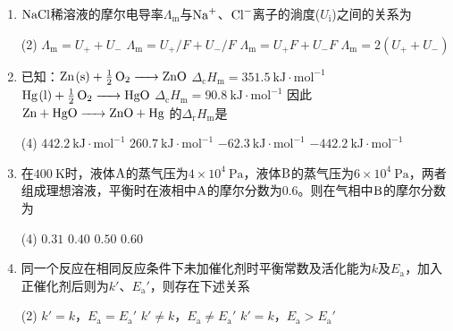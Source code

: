 \begin{enumerate}[label=\arabic*., itemsep=1.5ex]
    (1) $\ce{C(s) + 2S(s) = CS2(g)}$ \quad $K_1=0.258$

    (2) $\ce{Cu2S(s) + H2(g) = 2Cu(s) + H2S(g)}$ \quad $K_2=3.9\times10^{-3}$

    (3) $\ce{2H2S(g) = 2H2(g) + 2S(s)}$ \quad $K_3=2.29\times10^{-2}$

    则$1100^\circ\mathrm{C}$时反应 $\ce{C(s) + 2Cu2S(s) = 4Cu(s) + CS2(g)}$ 的$K$为
    \begin{tasks}(4)
        \task $8.99\times10^{-8}$
        \task $8.99\times10^{-5}$
        \task $3.69\times10^{-5}$
        \task $3.69\times10^{-8}$
    \end{tasks}
    \item $\ce{NaCl}$稀溶液的摩尔电导率$\Lambda_\mathrm{m}$与$\ce{Na+}$、$\ce{Cl-}$离子的淌度($U_\mathrm{i}$)之间的关系为
    \begin{tasks}(2)
        \task $\Lambda_\mathrm{m}=U_+ + U_-$
        \task $\Lambda_\mathrm{m}=U_+/F + U_-/F$
        \task $\Lambda_\mathrm{m}=U_+F + U_-F$
        \task $\Lambda_\mathrm{m}=2(U_+ + U_-)$
    \end{tasks}
    \item 已知：$\ce{Zn(s) + 1/2O2 -> ZnO}$ \quad $\Delta_\mathrm{c}H_\mathrm{m}=351.5\ \mathrm{kJ\cdot mol^{-1}}$
    $\ce{Hg(l) + 1/2O2 -> HgO}$ \quad $\Delta_\mathrm{c}H_\mathrm{m}=90.8\ \mathrm{kJ\cdot mol^{-1}}$
    因此 $\ce{Zn + HgO -> ZnO + Hg}$ 的$\Delta_\mathrm{r}H_\mathrm{m}$是
    \begin{tasks}(4)
        \task $442.2\ \mathrm{kJ\cdot mol^{-1}}$
        \task $260.7\ \mathrm{kJ\cdot mol^{-1}}$
        \task $-62.3\ \mathrm{kJ\cdot mol^{-1}}$
        \task $-442.2\ \mathrm{kJ\cdot mol^{-1}}$
    \end{tasks}
    \item 在$400\ \mathrm{K}$时，液体$\ce{A}$的蒸气压为$4\times10^4\ \mathrm{Pa}$，液体$\ce{B}$的蒸气压为$6\times10^4\ \mathrm{Pa}$，两者组成理想溶液，平衡时在液相中$\ce{A}$的摩尔分数为$0.6$。则在气相中$\ce{B}$的摩尔分数为
    \begin{tasks}(4)
        \task $0.31$
        \task $0.40$
        \task $0.50$
        \task $0.60$
    \end{tasks}
    \item 同一个反应在相同反应条件下未加催化剂时平衡常数及活化能为$k$及$E_\mathrm{a}$，加入正催化剂后则为$k'$、$E_\mathrm{a}'$，则存在下述关系
    \begin{tasks}(2)
        \task $k'=k$，$E_\mathrm{a}=E_\mathrm{a}'$
        \task $k'\neq k$，$E_\mathrm{a}\neq E_\mathrm{a}'$
        \task $k'=k$，$E_\mathrm{a}>E_\mathrm{a}'$

\end{tasks}
\end{enumerate}
